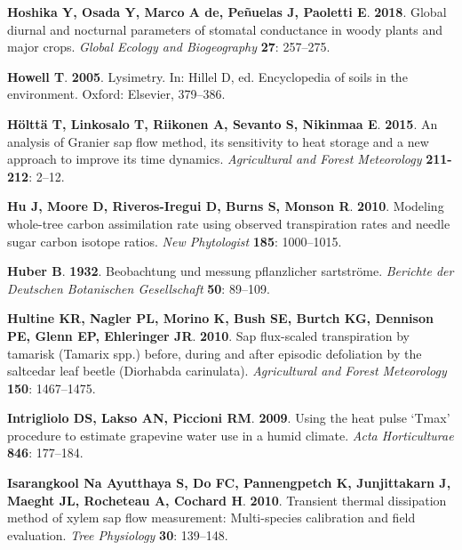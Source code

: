 \documentclass[11pt,twoside]{reedthesis}
\begin{document}
\hypertarget{ref-hoshika_global_2018}{}
\textbf{\textnormal{Hoshika Y}, \textnormal{Osada Y}, \textnormal{Marco
A de}, \textnormal{Peñuelas J}, \textnormal{Paoletti E}}. \textbf{2018}.
Global diurnal and nocturnal parameters of stomatal conductance in woody
plants and major crops. \emph{Global Ecology and Biogeography}
\textbf{27}: 257--275.

\hypertarget{ref-Howell2005}{}
\textbf{\textnormal{Howell T}}. \textbf{2005}. Lysimetry. In: Hillel D,
ed. Encyclopedia of soils in the environment. Oxford: Elsevier,
379--386.

\hypertarget{ref-Holtta2015}{}
\textbf{\textnormal{Hölttä T}, \textnormal{Linkosalo T},
\textnormal{Riikonen A}, \textnormal{Sevanto S}, \textnormal{Nikinmaa
E}}. \textbf{2015}. An analysis of Granier sap flow method, its
sensitivity to heat storage and a new approach to improve its time
dynamics. \emph{Agricultural and Forest Meteorology} \textbf{211-212}:
2--12.

\hypertarget{ref-Hu2010}{}
\textbf{\textnormal{Hu J}, \textnormal{Moore D},
\textnormal{Riveros-Iregui D}, \textnormal{Burns S}, \textnormal{Monson
R}}. \textbf{2010}. Modeling whole-tree carbon assimilation rate using
observed transpiration rates and needle sugar carbon isotope ratios.
\emph{New Phytologist} \textbf{185}: 1000--1015.

\hypertarget{ref-Huber1932}{}
\textbf{\textnormal{Huber B}}. \textbf{1932}. Beobachtung und messung
pflanzlicher sartströme. \emph{Berichte der Deutschen Botanischen
Gesellschaft} \textbf{50}: 89--109.

\hypertarget{ref-Hultine2010}{}
\textbf{\textnormal{Hultine KR}, \textnormal{Nagler PL},
\textnormal{Morino K}, \textnormal{Bush SE}, \textnormal{Burtch KG},
\textnormal{Dennison PE}, \textnormal{Glenn EP}, \textnormal{Ehleringer
JR}}. \textbf{2010}. Sap flux-scaled transpiration by tamarisk (Tamarix
spp.) before, during and after episodic defoliation by the saltcedar
leaf beetle (Diorhabda carinulata). \emph{Agricultural and Forest
Meteorology} \textbf{150}: 1467--1475.

\hypertarget{ref-Intrigliolo2009}{}
\textbf{\textnormal{Intrigliolo DS}, \textnormal{Lakso AN},
\textnormal{Piccioni RM}}. \textbf{2009}. Using the heat pulse `Tmax'
procedure to estimate grapevine water use in a humid climate. \emph{Acta
Horticulturae} \textbf{846}: 177--184.

\hypertarget{ref-IsarangkoolNaAyutthaya2010}{}
\textbf{\textnormal{Isarangkool Na Ayutthaya S}, \textnormal{Do FC},
\textnormal{Pannengpetch K}, \textnormal{Junjittakarn J},
\textnormal{Maeght JL}, \textnormal{Rocheteau A}, \textnormal{Cochard
H}}. \textbf{2010}. Transient thermal dissipation method of xylem sap
flow measurement: Multi-species calibration and field evaluation.
\emph{Tree Physiology} \textbf{30}: 139--148.
\end{document}
